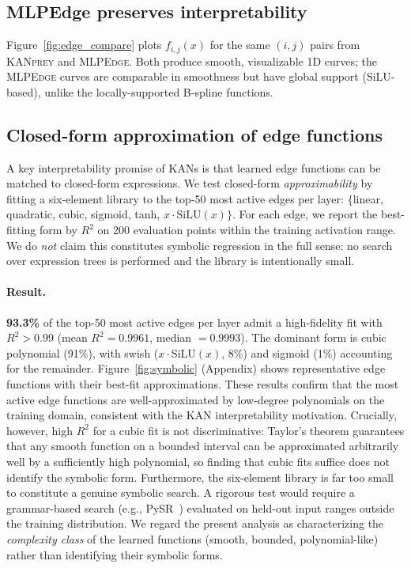 \documentclass{article}
\newcommand{\fij}{f_{i,j}}
\newcommand{\mlpedge}{\textsc{MLPEdge}}
\newcommand{\kanprey}{\textsc{KANprey}}
\begin{document}
\subsection{MLPEdge preserves interpretability}

Figure~\ref{fig:edge_compare} plots $\fij(x)$ for the same $(i,j)$ pairs
from \kanprey{} and \mlpedge{}.
Both produce smooth, visualizable 1D curves; the \mlpedge{} curves are
comparable in smoothness but have global support (SiLU-based), unlike the
locally-supported B-spline functions.

\subsection{Closed-form approximation of edge functions}
\label{sec:symbolic}

A key interpretability promise of KANs is that learned edge functions can be
matched to closed-form expressions.
We test closed-form \emph{approximability} by fitting a six-element library to
the top-50 most active edges per layer: $\{$linear, quadratic, cubic, sigmoid,
tanh, $x\cdot\text{SiLU}(x)\}$.
For each edge, we report the best-fitting form by $R^2$ on 200 evaluation points
within the training activation range.
We do \emph{not} claim this constitutes symbolic regression in the full sense:
no search over expression trees is performed and the library is intentionally
small.

\paragraph{Result.}
\textbf{93.3\%} of the top-50 most active edges per layer admit a high-fidelity
fit with $R^2 > 0.99$ (mean $R^2 = 0.9961$, median $= 0.9993$).
The dominant form is cubic polynomial (91\%), with swish ($x \cdot
\text{SiLU}(x)$, 8\%) and sigmoid (1\%) accounting for the remainder.
Figure~\ref{fig:symbolic} (Appendix) shows representative edge functions with
their best-fit approximations.
These results confirm that the most active edge functions are well-approximated
by low-degree polynomials on the training domain, consistent with the KAN
interpretability motivation.
Crucially, however, high $R^2$ for a cubic fit is not discriminative: Taylor's
theorem guarantees that any smooth function on a bounded interval can be
approximated arbitrarily well by a sufficiently high polynomial, so finding that
cubic fits suffice does not identify the symbolic form.
Furthermore, the six-element library is far too small to constitute a genuine
symbolic search.
A rigorous test would require a grammar-based search (e.g., PySR~\citep{cranmer2023interpretable})
evaluated on held-out input ranges outside the training distribution.
We regard the present analysis as characterizing the \emph{complexity class} of
the learned functions (smooth, bounded, polynomial-like) rather than identifying
their symbolic forms.
\end{document}
